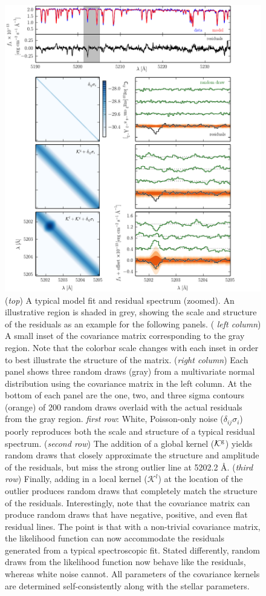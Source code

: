 \documentclass[iop,floatfix]{emulateapj}
\begin{document}
\begin{figure}[!htb]
\begin{center}
\includegraphics{figs/matrix_compilation.pdf}
\caption{ ({\it top}) A typical model fit and residual spectrum (zoomed). An illustrative region is shaded in grey, showing the scale and structure of the residuals as an example for the following panels. ({ \it left column}) A small inset of the covariance matrix corresponding to the gray region. Note that the colorbar scale changes with each inset in order to best illustrate the structure of the matrix. ({\it right column}) Each panel shows three random draws (gray) from a multivariate normal distribution using the covariance matrix in the left column. At the bottom of each panel are the one, two, and three sigma contours (orange) of 200 random draws overlaid with the actual residuals from the gray region. {\it first row}: White, Poisson-only noise ($\delta_{ij}\sigma_i$) poorly reproduces both the scale and structure of a typical residual spectrum. ({\it second row}) The addition of a global kernel ($\mathcal{K}^{\rm g}$) yields random draws that closely approximate the structure and amplitude of the residuals, but miss the strong outlier line at 5202.2 \AA. ({\it third row}) Finally, adding in a local kernel ($\mathcal{K}^l$) at the location of the outlier produces random draws that completely match the structure of the residuals. Interestingly, note that the covariance matrix can produce random draws that have negative, positive, and even flat residual lines. The point is that with a non-trivial covariance matrix, the likelihood function can now accommodate the residuals generated from a typical spectroscopic fit. Stated differently, random draws from the likelihood function now behave like the residuals, whereas white noise cannot. All parameters of the covariance kernels are determined self-consistently along with the stellar parameters. }

\end{center}
\end{figure}
\end{document}

